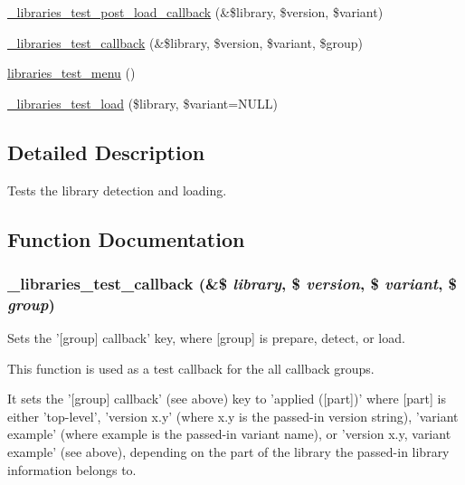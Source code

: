 \begin{DoxyCompactItemize}
\item 
\hyperlink{libraries__test_8module_a56d80a842e84c804712408cf7a1cbb19}{\_\-libraries\_\-test\_\-post\_\-load\_\-callback} (\&\$library, \$version, \$variant)
\item 
\hyperlink{libraries__test_8module_a4ecb0be495ba6a434403bc89961cbb8d}{\_\-libraries\_\-test\_\-callback} (\&\$library, \$version, \$variant, \$group)
\item 
\hyperlink{libraries__test_8module_a9c8df89dd58a432de148610dcdc2a8d9}{libraries\_\-test\_\-menu} ()
\item 
\hyperlink{libraries__test_8module_acd62f5a0e48ea74be7d66de8f440da6e}{\_\-libraries\_\-test\_\-load} (\$library, \$variant=NULL)
\end{DoxyCompactItemize}


\subsection{Detailed Description}
Tests the library detection and loading. 

\subsection{Function Documentation}
\hypertarget{libraries__test_8module_a4ecb0be495ba6a434403bc89961cbb8d}{
\subsubsection[{\_\-libraries\_\-test\_\-callback}]{\setlength{\rightskip}{0pt plus 5cm}\_\-libraries\_\-test\_\-callback (\&\$ {\em library}, \/  \$ {\em version}, \/  \$ {\em variant}, \/  \$ {\em group})}}
\label{libraries__test_8module_a4ecb0be495ba6a434403bc89961cbb8d}
Sets the '\mbox{[}group\mbox{]} callback' key, where \mbox{[}group\mbox{]} is prepare, detect, or load.

This function is used as a test callback for the all callback groups.

It sets the '\mbox{[}group\mbox{]} callback' (see above) key to 'applied (\mbox{[}part\mbox{]})' where \mbox{[}part\mbox{]} is either 'top-\/level', 'version x.y' (where x.y is the passed-\/in version string), 'variant example' (where example is the passed-\/in variant name), or 'version x.y, variant example' (see above), depending on the part of the library the passed-\/in library information belongs to.


